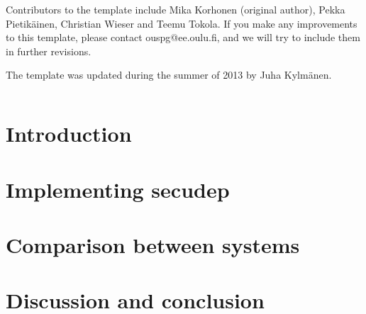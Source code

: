 \documentclass[a4paper,12pt,titlepage]{dithesis}
\begin{document}
Contributors to the template include Mika Korhonen (original author),
Pekka Pietikäinen, Christian Wieser and Teemu Tokola.  If you make any
improvements to this template, please contact ouspg@ee.oulu.fi, and we
will try to include them in further revisions.

The template was updated during the summer of 2013 by Juha Kylmänen.


\setlongtables
\begin{longtable}[l]{p{3cm}p{}}
  
\end{longtable}
\setcounter{table}{0}

\chapter{Introduction}
\sivunumerot{}

\chapter{Implementing secudep}

\chapter{Comparison between systems}

\chapter{Discussion and conclusion}




\end{document}

